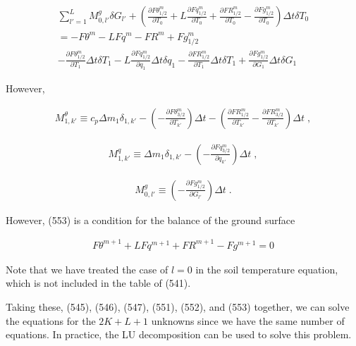 \begin{eqnarray}
  {\sum_{l'=1}^{L} M^g_{0,l'} \delta G_{l'}
           +  \left(    \frac{\partial{F\theta^{m}_{1/2}}}{\partial {T_0}}
           +  L \frac{\partial{Fq^{m}_{1/2}}}{\partial {T_0}}
           +    \frac{\partial{FR^{m}_{1/2}}}{\partial {T_0}}
           -  \frac{\partial{Fg^{m}_{1/2}}}{\partial {T_0}} \right) \Delta t\delta T_0  }
         \\
         =  - F\theta^{m} - L Fq^{m} - FR^{m} +  Fg^{m}_{1/2}  \\
         -    \frac{\partial{F\theta^{m}_{1/2}}}{\partial {T_1}} \Delta t\delta T_1
           -  L \frac{\partial{Fq^{m}_{1/2}}}{\partial {q_1}} \Delta t\delta q_1
           -    \frac{\partial{FR^{m}_{1/2}}}{\partial {T_1}} \Delta t\delta T_1
           +    \frac{\partial{Fg^{m}_{1/2}}}{\partial {G_1}} \Delta t\delta G_1
\end{eqnarray}

However,

\begin{eqnarray}
M^{\theta}_{1,k'} \equiv c_p \Delta m_1 \delta_{1,k'}
          -  \left(
                   - \frac{\partial{F\theta^{m}_{3/2}}}{\partial {T_{k'}}} \right) \Delta t
          -  \left( \frac{\partial{FR^{m}_{1/2}}}{\partial {T_{k'}}}
                   - \frac{\partial{FR^{m}_{3/2}}}{\partial {T_{k'}}} \right) \Delta t \; ,
\end{eqnarray}

\begin{eqnarray}
M^{q}_{1,k'} \equiv \Delta m_1 \delta_{1,k'}
          -  \left(
                   - \frac{\partial{Fq^{m}_{3/2}}}{\partial {q_{k'}}} \right) \Delta t \; ,
\end{eqnarray}

\begin{eqnarray}
M^{g}_{0,l'} \equiv
             \left(
                   - \frac{\partial{Fg^{m}_{1/2}}}{\partial {G_{l'}}} \right) \Delta t \; .
\end{eqnarray}

However, (553) is a condition for the balance of the ground surface

\begin{eqnarray}
   F\theta^{m+1} + L Fq^{m+1} + FR^{m+1} - Fg^{m+1} = 0
\end{eqnarray}

Note that we have treated the case of \(l=0\) in the soil temperature equation, which is not included in the table of (541).

Taking these, (545), (546), (547), (551), (552), and (553) together, we can solve the equations for the \(2K+L+1\) unknowns since we have the same number of equations. In practice, the LU
decomposition can be used to solve this problem.

